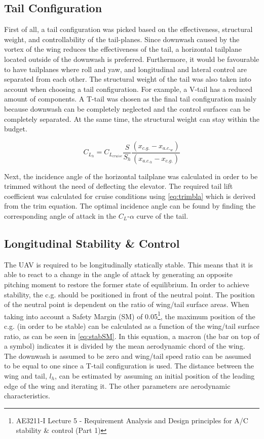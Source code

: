 \subsection{Tail Configuration}
First of all, a tail configuration was picked based on the effectiveness, structural weight, and controllability of the tail-planes. Since downwash caused by the vortex of the wing reduces the effectiveness of the tail, a horizontal tailplane located outside of the downwash is preferred. Furthermore, it would be favourable to have tailplanes where roll and yaw, and longitudinal and lateral control are separated from each other. The structural weight of the tail was also taken into account when choosing a tail configuration. For example, a V-tail has a reduced amount of components. 
A T-tail was chosen as the final tail configuration mainly because downwash can be completely neglected and the control surfaces can be completely separated. At the same time, the structural weight can stay within the budget.

\begin{equation}
\label{eq:trimbla}
    C_{L_{h}} = C_{L_{cruise}}\frac{S}{S_h}\frac{(x_{c.g.}-x_{a.c._{w}})}{(x_{a.c._{h}}-x_{c.g.})}
\end{equation}

Next, the incidence angle of the horizontal tailplane was calculated in order to be trimmed without the need of deflecting the elevator. The required tail lift coefficient was calculated for cruise conditions using \autoref{eq:trimbla} which is derived from the trim equation. The optimal incidence angle can be found by finding the corresponding angle of attack in the $C_L$-$\alpha$ curve of the tail.

\subsection{Longitudinal Stability \& Control}
The UAV is required to be longitudinally statically stable. This means that it is able to react to a change in the angle of attack by generating an opposite pitching moment to restore the former state of equilibrium. In order to achieve stability, the c.g. should be positioned in front of the neutral point. The position of the neutral point is dependent on the ratio of wing/tail surface areas. When taking into account a Safety Margin (SM) of 0.05\footnote{AE3211-I Lecture 5 - Requirement Analysis and Design principles for A/C stability \& control (Part 1)}, the maximum position of the c.g. (in order to be stable) can be calculated as a function of the wing/tail surface ratio, as can be seen in \autoref{eq:stabSM}. In this equation, a macron (the bar on top of a symbol) indicates it is divided by the mean aerodynamic chord of the wing. The downwash is assumed to be zero and wing/tail speed ratio can be assumed to be equal to one since a T-tail configuration is used. The distance between the wing and tail, $l_h$, can be estimated by assuming an initial position of the leading edge of the wing and iterating it. The other parameters are aerodynamic characteristics.

